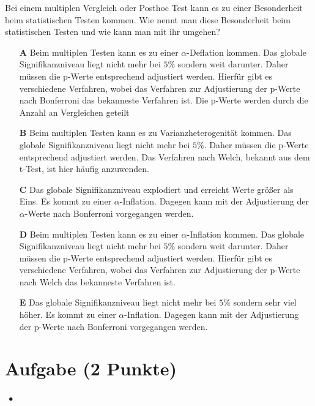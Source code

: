 \documentclass[a4paper, 9pt]{scrartcl}\usepackage[]{graphicx}\usepackage[]{xcolor}
\begin{document}
Bei einem multiplen Vergleich oder Posthoc Test kann es zu einer Besonderheit beim statistischen Testen kommen. Wie nennt man diese Besonderheit beim statistischen Testen und wie kann man mit ihr umgehen?



\begin{enumerate}
\item [\textbf{A} \msquare] Beim multiplen Testen kann es zu einer $\alpha$-Deflation kommen. Das globale Signifikanzniveau liegt nicht mehr bei $5\%$ sondern weit darunter. Daher müssen die p-Werte entsprechend adjustiert werden. Hierfür gibt es verschiedene Verfahren, wobei das Verfahren zur Adjustierung der p-Werte nach Bonferroni das bekanneste Verfahren ist. Die p-Werte werden durch die Anzahl an Vergleichen geteilt
\item [\textbf{B} \msquare] Beim multiplen Testen kann es zu Varianzheterogenität kommen. Das globale Signifikanzniveau liegt nicht mehr bei $5\%$. Daher müssen die p-Werte entsprechend adjustiert werden. Das Verfahren nach Welch, bekannt aus dem t-Test, ist hier häufig anzuwenden.
\item [\textbf{C} \msquare] Das globale Signifikanzniveau explodiert und erreicht Werte größer als Eins. Es kommt zu einer $\alpha$-Inflation. Dagegen kann mit der Adjustierung der $\alpha$-Werte nach Bonferroni vorgegangen werden.
\item [\textbf{D} \msquare] Beim multiplen Testen kann es zu einer $\alpha$-Inflation kommen. Das globale Signifikanzniveau liegt nicht mehr bei $5\%$ sondern weit darunter. Daher müssen die p-Werte entsprechend adjustiert werden. Hierfür gibt es verschiedene Verfahren, wobei das Verfahren zur Adjustierung der p-Werte nach Welch das bekanneste Verfahren ist.
\item [\textbf{E} \msquare] Das globale Signifikanzniveau liegt nicht mehr bei $5\%$ sondern sehr viel höher. Es kommt zu einer $\alpha$-Inflation. Dagegen kann mit der Adjustierung der p-Werte nach Bonferroni vorgegangen werden.
\end{enumerate}

\section{Aufgabe \hfill (2 Punkte)}

\ifcollection
\begin{flushright}
\tiny\vspace{-2Ex}
\textbf{\examinhaltstart}
\exammodulestatversuch $\;\bullet$
\exammodulebiostat
\vspace{-1Ex}
\end{flushright}
\fi
\end{document}
